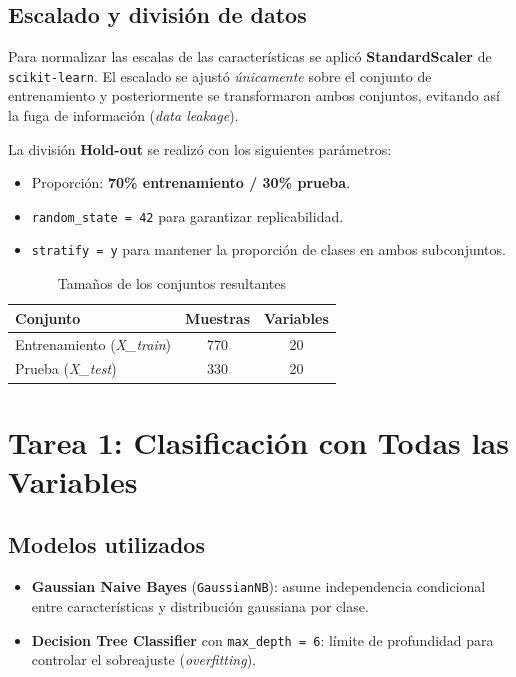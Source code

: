 \documentclass[12pt, letterpaper]{article}
\begin{document}
\subsection{Escalado y división de datos}

Para normalizar las escalas de las características se aplicó
\textbf{StandardScaler} de \texttt{scikit-learn}. El escalado se ajustó
\emph{únicamente} sobre el conjunto de entrenamiento y posteriormente se
transformaron ambos conjuntos, evitando así la fuga de información
(\textit{data leakage}).

La división \textbf{Hold-out} se realizó con los siguientes parámetros:

\begin{itemize}
    \item Proporción: \textbf{70\% entrenamiento / 30\% prueba}.
    \item \texttt{random\_state = 42} para garantizar replicabilidad.
    \item \texttt{stratify = y} para mantener la proporción de clases en ambos
          subconjuntos.
\end{itemize}

\begin{table}[H]
    \centering
    \caption{Tamaños de los conjuntos resultantes}
    \label{tab:split}
    \begin{tabular}{lcc}
        \toprule
        \textbf{Conjunto} & \textbf{Muestras} & \textbf{Variables} \\
        \midrule
        \rowcolor{rowgray} Entrenamiento (\textit{X\_train}) & 770 & 20 \\
        Prueba (\textit{X\_test})                            & 330 & 20 \\
        \bottomrule
    \end{tabular}
\end{table}

\section{Tarea 1: Clasificación con Todas las Variables}

\subsection{Modelos utilizados}

\begin{itemize}
    \item \textbf{Gaussian Naive Bayes} (\texttt{GaussianNB}): asume
          independencia condicional entre características y distribución
          gaussiana por clase.
    \item \textbf{Decision Tree Classifier} con \texttt{max\_depth = 6}:
          límite de profundidad para controlar el sobreajuste
          (\textit{overfitting}).
\end{itemize}
\end{document}
